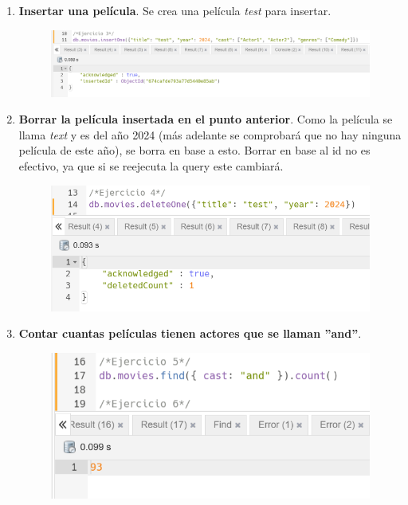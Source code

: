 \documentclass[a4paper,onecolumn]{article}
\begin{document}
\begin{sloppypar}
\begin{enumerate}
\begin{center}
\begin{figure}[H]
        \end{figure}
    \end{center}
    \item \textbf{Insertar una película}. Se crea una película \textit{test} para insertar.
    \begin{center}
        \begin{figure}[h!]
            \includegraphics[width=\textwidth]{querys/3.png}
        \end{figure}
    \end{center}
    \item \textbf{Borrar la película insertada en el punto anterior}. Como la película se llama \textit{text} y es del año 2024 (más adelante se comprobará
    que no hay ninguna película de este año), se borra en base a esto. Borrar en base al id no es efectivo, ya que si se reejecuta la query este cambiará.
    \begin{center}
        \begin{figure}[h!]
            \includegraphics[width=\textwidth]{querys/4.png}
        \end{figure}
    \end{center}
    \item \textbf{Contar cuantas películas tienen actores que se llaman ''and''}.
    \begin{center}
        \begin{figure}[h!]
            \includegraphics[width=\textwidth]{querys/5.png}

\end{figure}
\end{center}
\end{enumerate}
\end{sloppypar}
\end{document}
